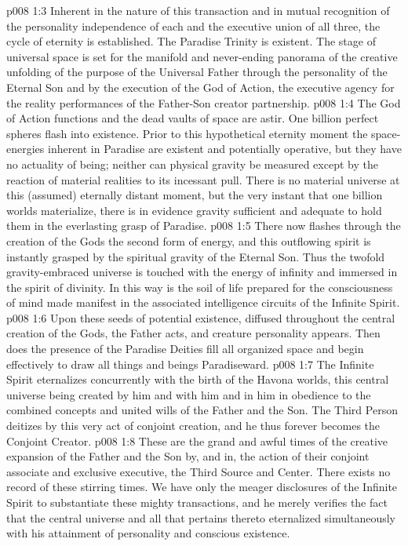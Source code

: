 \vs p008 1:3 Inherent in the nature of this transaction and in mutual recognition of the personality independence of each and the executive union of all three, the cycle of eternity is established. The Paradise Trinity is existent. The stage of universal space is set for the manifold and never\hyp{}ending panorama of the creative unfolding of the purpose of the Universal Father through the personality of the Eternal Son and by the execution of the God of Action, the executive agency for the reality performances of the Father\hyp{}Son creator partnership.
\vs p008 1:4 \pc The God of Action functions and the dead vaults of space are astir. One billion perfect spheres flash into existence. Prior to this hypothetical eternity moment the space\hyp{}energies inherent in Paradise are existent and potentially operative, but they have no actuality of being; neither can physical gravity be measured except by the reaction of material realities to its incessant pull. There is no material universe at this (assumed) eternally distant moment, but the very instant that one billion worlds materialize, there is in evidence gravity sufficient and adequate to hold them in the everlasting grasp of Paradise.
\vs p008 1:5 There now flashes through the creation of the Gods the second form of energy, and this outflowing spirit is instantly grasped by the spiritual gravity of the Eternal Son. Thus the twofold gravity\hyp{}embraced universe is touched with the energy of infinity and immersed in the spirit of divinity. In this way is the soil of life prepared for the consciousness of mind made manifest in the associated intelligence circuits of the Infinite Spirit.
\vs p008 1:6 Upon these seeds of potential existence, diffused throughout the central creation of the Gods, the Father acts, and creature personality appears. Then does the presence of the Paradise Deities fill all organized space and begin effectively to draw all things and beings Paradiseward.
\vs p008 1:7 \pc The Infinite Spirit eternalizes concurrently with the birth of the Havona worlds, this central universe being created by him and with him and in him in obedience to the combined concepts and united wills of the Father and the Son. The Third Person deitizes by this very act of conjoint creation, and he thus forever becomes the Conjoint Creator.
\vs p008 1:8 \pc These are the grand and awful times of the creative expansion of the Father and the Son by, and in, the action of their conjoint associate and exclusive executive, the Third Source and Center. There exists no record of these stirring times. We have only the meager disclosures of the Infinite Spirit to substantiate these mighty transactions, and he merely verifies the fact that the central universe and all that pertains thereto eternalized simultaneously with his attainment of personality and conscious existence.
